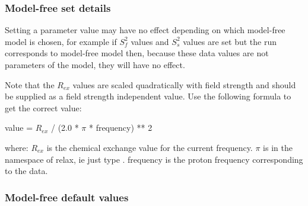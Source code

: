 \subsubsection{Model-free set details}

Setting a parameter value may have no effect depending on which model-free model is chosen,
for example if $S^2_f$ values and $S^2_s$ values are set but the run corresponds to model-free model
 then, because these data values are not parameters of the model, they will have no
effect.

Note that the $R_{ex}$ values are scaled quadratically with field strength and should be supplied
as a field strength independent value.  Use the following formula to get the correct value:

    value = $R_{ex}$ / (2.0 * $\pi$ * frequency) ** 2

where:
    $R_{ex}$ is the chemical exchange value for the current frequency.
    $\pi$ is in the namespace of relax, ie just type 
.
    frequency is the proton frequency corresponding to the data.


\subsubsection{Model-free default values}



